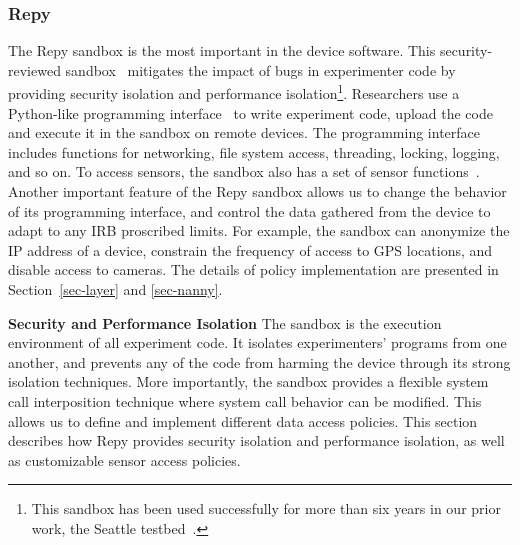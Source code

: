 \subsubsection{Repy} The Repy sandbox is the most important in the device software. This 
security-reviewed sandbox~\cite{cappos2010retaining} mitigates the 
impact of bugs in experimenter code by providing security isolation 
and performance isolation\footnote{\scriptsize 
This sandbox has been used successfully for more than six years in our 
prior work, the Seattle testbed~\cite{seattle}.}. 
Researchers use a Python-like programming interface~\cite{repyv2}
to write experiment code, upload the code and execute it in the
sandbox on remote devices. The programming interface includes functions for networking, 
file system access, threading, locking, logging, and so on. To access sensors, 
the sandbox also has a set of sensor functions~\cite{sensors}. 
%
Another important feature of the Repy sandbox allows us to change the 
behavior of its programming interface, and control the 
data gathered from the device to adapt to any IRB proscribed limits. 
For example, the sandbox can anonymize the IP address of a device, constrain  
the frequency of access to GPS locations, and disable
access to cameras. 
The details of policy implementation are presented in 
Section~\ref{sec-layer} and \ref{sec-nanny}.

\textbf{Security and Performance Isolation}
The sandbox is the execution environment 
of all experiment code. It isolates experimenters' programs from one 
another, and prevents any of the code from harming the device 
through its strong isolation techniques. More importantly, the sandbox
provides a flexible system call interposition technique where system call behavior 
can be modified. This allows us to define and implement
different data access policies. This section describes how Repy provides
security isolation and performance isolation, as well as customizable
sensor access policies.




